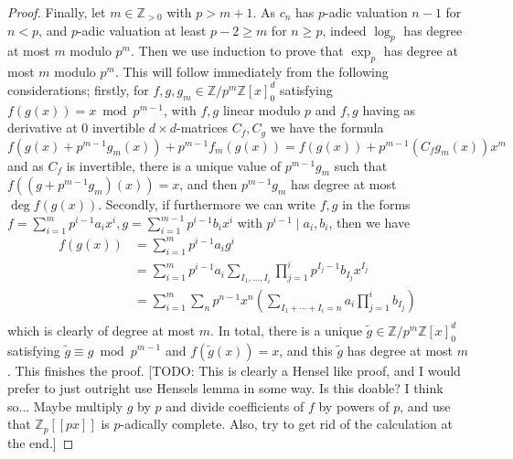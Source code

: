 \documentclass[12pt]{article}
\newcommand{\Z}{\mathbb{Z}}
\theoremstyle{plain}
\theoremstyle{definition}
\theoremstyle{remark}
\begin{document}
\begin{proof}
Finally, let $m \in \Z_{>0}$ with $p > m+1$. As $c_n$ has $p$-adic valuation $n-1$ for $n < p$, and $p$-adic valuation at least $p-2 \geq m$ for $n \geq p$, indeed $\log_p$ has degree at most $m$ modulo $p^m$. Then we use induction to prove that $\exp_p$ has degree at most $m$ modulo $p^m$. This will follow immediately from the following considerations; firstly, for $f,g,g_m \in \Z/p^m\Z[x]_0^d$ satisfying $f(g(x)) = x \bmod p^{m-1}$, with $f,g$ linear modulo $p$ and $f,g$ having as derivative at $0$ invertible $d\times d$-matrices $C_f,C_g$ we have the formula
\[
f(g(x) + p^{m-1}g_m(x))+p^{m-1}f_m(g(x)) = f(g(x)) + p^{m-1}(C_f g_m(x))x^m
\]
and as $C_f$ is invertible, there is a unique value of $p^{m-1}g_m$ such that $f((g+p^{m-1}g_m)(x)) = x$, and then $p^{m-1}g_m$ has degree at most $\deg f(g(x))$. Secondly, if furthermore we can write $f,g$ in the forms $f = \sum_{i=1}^m p^{i-1}a_i x^i,g = \sum_{i=1}^{m-1} p^{i-1}b_i x^i$ with $p^{i-1}\mid a_i,b_i$, then we have
\begin{align*}
f(g(x)) &= \sum_{i=1}^m p^{i-1} a_i g^i \\
        &= \sum_{i=1}^m p^{i-1} a_i \sum_{I_1,\dots,I_{i}} \prod_{j=1}^i p^{I_j-1} b_{I_j} x^{I_j} \\
        &= \sum_{i=1}^m \sum_n p^{n-1} x^n \left(\sum_{I_1 + \cdots +I_{i} = n} a_i \prod_{j=1}^i b_{I_j}\right) \\
\end{align*}
which is clearly of degree at most $m$. In total, there is a unique $\tilde{g} \in \Z/p^m\Z[x]_0^d$ satisfying $\tilde{g} \equiv g \bmod p^{m-1}$ and $f(\tilde{g}(x))=x$, and this $\tilde{g}$ has degree at most $m$. This finishes the proof.
[TODO: This is clearly a Hensel like proof, and I would prefer to just outright use Hensels lemma in some way. Is this doable? I think so... Maybe multiply $g$ by $p$ and divide coefficients of $f$ by powers of $p$, and use that $\Z_p[[px]]$ is $p$-adically complete. Also, try to get rid of the calculation at the end.]
\end{proof}
\end{document}
